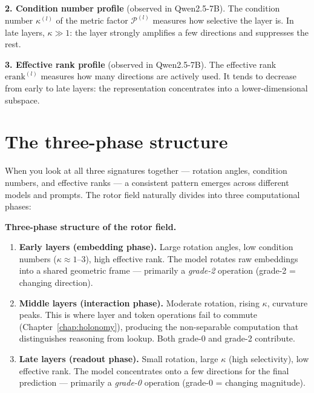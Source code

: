 \documentclass[11pt, twoside, openright]{memoir}
\newcommand{\metric}[1]{\mathcal{P}^{(#1)}} %
\begin{document}
\begin{finding}
\textbf{2. Condition number profile} (observed in Qwen2.5-7B).
The condition number $\kappa^{(l)}$ of the metric factor $\metric{l}$
measures how selective the layer is.  In late layers, $\kappa \gg 1$:
the layer strongly amplifies a few directions and suppresses the rest.
\end{finding}

\begin{finding}
\textbf{3. Effective rank profile} (observed in Qwen2.5-7B).
The effective rank $\mathrm{erank}^{(l)}$ measures how many directions
are actively used.  It tends to decrease from early to late layers: the
representation concentrates into a lower-dimensional subspace.
\end{finding}

\section{The three-phase structure}

When you look at all three signatures together --- rotation angles,
condition numbers, and effective ranks --- a consistent pattern emerges
across different models and prompts.  The rotor field naturally divides
into three computational phases:

\begin{gabox}
\textbf{Three-phase structure of the rotor field.}
\begin{enumerate}[nosep]
\item \textbf{Early layers (embedding phase).}  Large rotation angles,
  low condition numbers ($\kappa \approx 1$--$3$), high effective rank.
  The model rotates raw embeddings into a shared geometric frame ---
  primarily a \emph{grade-2} operation (grade-2 = changing direction).
\item \textbf{Middle layers (interaction phase).}  Moderate rotation,
  rising $\kappa$, curvature peaks.  This is where layer and token
  operations fail to commute (Chapter~\ref{chap:holonomy}), producing
  the non-separable computation that distinguishes reasoning from lookup.
  Both grade-0 and grade-2 contribute.
\item \textbf{Late layers (readout phase).}  Small rotation, large
  $\kappa$ (high selectivity), low effective rank.  The model
  concentrates onto a few directions for the final prediction ---
  primarily a \emph{grade-0} operation (grade-0 = changing magnitude).
\end{enumerate}
\end{gabox}
\end{document}
